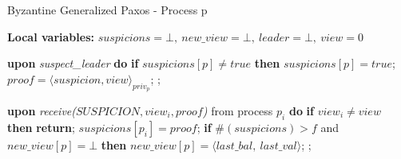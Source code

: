 \begin{algorithm} 
	\caption{Byzantine Generalized Paxos - Process p}
	\label{BFT-Proc}
	\textbf{Local variables:} $suspicions = \bot,\ new\_view = \bot,\ leader = \bot,\ view = 0$
	\begin{algorithmic}[1]
		
		\State \textbf{upon} \textit{suspect\_leader} \textbf{do} 
		\State \hspace{\algorithmicindent} \textbf{if} $suspicions[p] \neq true$ \textbf{then}
		\State\hspace{\algorithmicindent}\hspace{\algorithmicindent} $suspicions[p] = true$;
		\State\hspace{\algorithmicindent}\hspace{\algorithmicindent} $proof = \langle suspicion, view \rangle_{priv_p}$;
		\State\hspace{\algorithmicindent}\hspace{\algorithmicindent} ;	
		\State
		
		\State \textbf{upon} \textit{receive($SUSPICION, view_i, proof$)} from process $p_i$ \textbf{do} 
		\State \hspace{\algorithmicindent} \textbf{if} $view_i \neq view$ \textbf{then}
		\State \hspace{\algorithmicindent}\hspace{\algorithmicindent} \textbf{return};
		\State
		\State \hspace{\algorithmicindent} $suspicions[p_i] = proof$;
		\State \hspace{\algorithmicindent} \textbf{if} $\#(suspicions) > f$ and $new\_view[p] = \bot$ \textbf{then}
		\State\hspace{\algorithmicindent}\hspace{\algorithmicindent} $new\_view[p] = \langle last\_bal,\ last\_val \rangle$;
		\State\hspace{\algorithmicindent}\hspace{\algorithmicindent}  ;
		\State
		

\end{algorithmic}
\end{algorithm}
